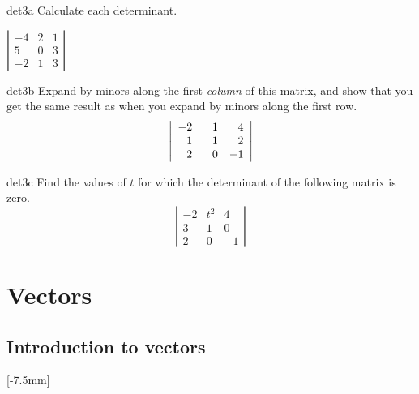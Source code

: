 \documentclass[svgnames]{watsonbook}
\begin{document}
\begin{exercise}{}{det3a} \setcounter{subitm}{1}
  Calculate each determinant. 

{$\left|\begin{array}{ccc} -4 & 2 & 1 \\ 5 & 0 & 3 \\ -2 & 1 & 3 \end{array}\right|$}
\end{exercise}

\begin{exercise}{}{det3b}
  Expand by minors along the first \textit{column} of this matrix, and show that you get the same result as when you expand by minors along the first row. 
  \[
    \left|\begin{array}{ccc} -2 & \hphantom{-}1 & \hphantom{-}4 \\  \hphantom{-}1 & \hphantom{-}1 & \hphantom{-}2 \\ \hphantom{-}2 & \hphantom{-}0  & -1 \end{array}\right|
  \]
\end{exercise}

\begin{exercise}{}{det3c}
  Find the values of $t$ for which the determinant of the following matrix is zero.  
  \[
    \left|\begin{array}{ccc} -2 & t^2 & 4 \\  3 & 1 & 0 \\ 2 & 0  & -1 \end{array}\right|
  \]
\end{exercise}


\chapter{Vectors}

\section{Introduction to vectors} \label{sec:vectors} 

[-7.5mm]
\end{document}
